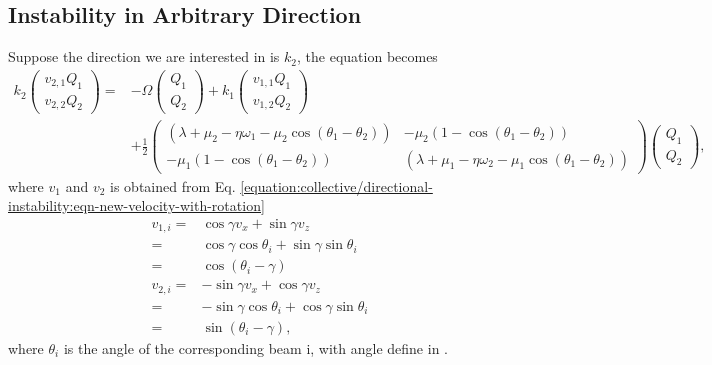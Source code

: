 \documentclass[letterpaper,12pt,english]{sphinxmanual}
\begin{document}
\subsection{Instability in Arbitrary Direction}
\label{\detokenize{collective/directional-instability:instability-in-arbitrary-direction}}
Suppose the direction we are interested in is \(k_2\), the equation becomes
\begin{equation*}
\begin{split}k_2 \begin{pmatrix}
v_{2,1} Q_1 \\
v_{2,2} Q_2
\end{pmatrix} =& - \Omega  \begin{pmatrix}
Q_1 \\
Q_2
\end{pmatrix} + k_1 \begin{pmatrix}
v_{1,1} Q_1 \\
v_{1,2} Q_2
\end{pmatrix} \\
&+\frac{1}{2}\begin{pmatrix}
(\lambda+ \mu_2 - \eta \omega_1 - \mu_2 \cos(\theta_1-\theta_2) ) & -\mu_2 (1-\cos(\theta_1-\theta_2)) \\
-\mu_1 (1- \cos(\theta_1-\theta_2)) & (\lambda + \mu_1 - \eta \omega_2 - \mu_1 \cos(\theta_1-\theta_2) )
\end{pmatrix}\begin{pmatrix}
Q_1 \\
Q_2
\end{pmatrix},\end{split}
\end{equation*}
where \(v_1\) and \(v_2\) is obtained from Eq. \eqref{equation:collective/directional-instability:eqn-new-velocity-with-rotation}
\begin{equation*}
\begin{split}v_{1,i} =& \cos\gamma v_x + \sin\gamma v_z \\
=& \cos\gamma \cos\theta_i + \sin\gamma \sin\theta_i \\
=& \cos(\theta_i - \gamma)\\
v_{2,i} =& -\sin\gamma v_x + \cos\gamma v_z \\
=& -\sin\gamma \cos\theta_i + \cos\gamma \sin\theta_i\\
=& \sin(\theta_i - \gamma),\end{split}
\end{equation*}
where \(\theta_i\) is the angle of the corresponding beam i, with angle define in {\hyperref[\detokenize{collective/some-clarifications:two-beams-model}]{}}.
\end{document}
